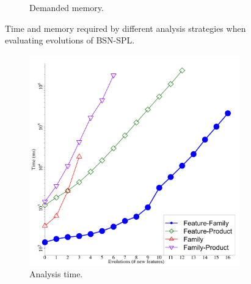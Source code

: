 \begin{figure}[p]
\begin{subfigure}[t]{0.5\columnwidth}
    \caption{Demanded memory.}
    \label{fig:bsn-footprint}
  \end{subfigure}
  \caption{Time and memory required by different analysis strategies when
  evaluating evolutions of BSN-SPL.}
  \label{fig:bsn-scalability}
\end{figure}


\begin{figure}[p]
  \begin{subfigure}[t]{0.5\columnwidth}
    \centering
    \includegraphics[width=1.0\columnwidth]{img/logliftTime}
    \caption{Analysis time.}
    \label{fig:lift-analysisTime}
  \end{subfigure}
  \begin{subfigure}[t]{0.5\columnwidth}
    \centering

\end{subfigure}
\end{figure}
